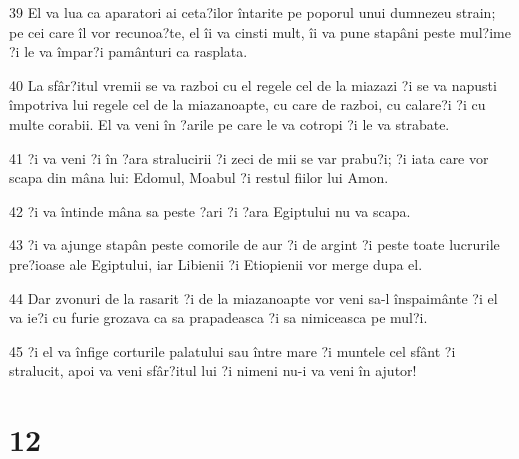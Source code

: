 \par 39 El va lua ca aparatori ai ceta?ilor întarite pe poporul unui dumnezeu strain; pe cei care îl vor recunoa?te, el îi va cinsti mult, îi va pune stapâni peste mul?ime ?i le va împar?i pamânturi ca rasplata.
\par 40 La sfâr?itul vremii se va razboi cu el regele cel de la miazazi ?i se va napusti împotriva lui regele cel de la miazanoapte, cu care de razboi, cu calare?i ?i cu multe corabii. El va veni în ?arile pe care le va cotropi ?i le va strabate.
\par 41 ?i va veni ?i în ?ara stralucirii ?i zeci de mii se var prabu?i; ?i iata care vor scapa din mâna lui: Edomul, Moabul ?i restul fiilor lui Amon.
\par 42 ?i va întinde mâna sa peste ?ari ?i ?ara Egiptului nu va scapa.
\par 43 ?i va ajunge stapân peste comorile de aur ?i de argint ?i peste toate lucrurile pre?ioase ale Egiptului, iar Libienii ?i Etiopienii vor merge dupa el.
\par 44 Dar zvonuri de la rasarit ?i de la miazanoapte vor veni sa-l înspaimânte ?i el va ie?i cu furie grozava ca sa prapadeasca ?i sa nimiceasca pe mul?i.
\par 45 ?i el va înfige corturile palatului sau între mare ?i muntele cel sfânt ?i stralucit, apoi va veni sfâr?itul lui ?i nimeni nu-i va veni în ajutor!

\chapter{12}

